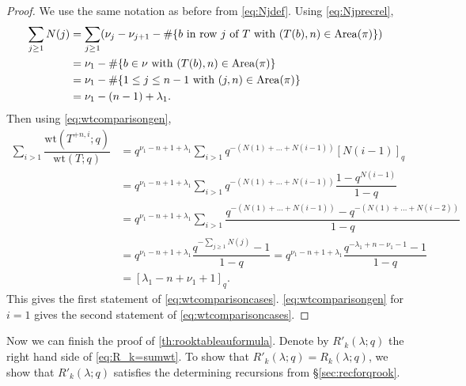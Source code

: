 \documentclass[12pt,reqno]{amsart}
\theoremstyle{plain}
\newtheorem{theorem}{Theorem}[section]
\theoremstyle{definition}
\theoremstyle{remark}
\theoremstyle{example}
\numberwithin{equation}{section}
\newcommand\ZZ{\mathbb{Z}}
\newcommand\Par{\mathrm{Par}}
\newcommand{\SYT}{\mathrm{SYT}}
\newcommand{\wt}{\mathrm{wt}}
\newcommand{\Area}{\mathrm{Area}}
\newcommand{\DD}{\mathbb{D}}
\begin{document}
\begin{proof}
We use the same notation as before from \eqref{eq:Njdef}. Using \eqref{eq:Njprecrel}, 
	\begin{align*}
		\sum_{j \geq 1} N(j) &= \sum_{j \geq 1}(\nu_{j}-\nu_{j+1} - \#\{b \hbox{ in row } j \hbox{ of } T \hbox{ with } (T(b),n) \in \Area(\pi)\})
		\\
		&= \nu_1 - \#\{b \in \nu  \hbox{ with } (T(b),n) \in \Area(\pi)\} 
		\\
		&= \nu_1 - \#\{1 \leq j \leq n-1 \hbox{ with } (j,n) \in \Area(\pi)\}
		\\
		&= \nu_1 - (n-1) + \lambda_1.
	\end{align*} Then using \eqref{eq:wtcomparisongen},
	\begin{align*}
		\sum_{i>1} \dfrac{\wt(T^{+n,i};q)}{\wt(T;q)}
		&= q^{\nu_1 - n +1  + \lambda_1} \sum_{i>1}   q^{- (N(1)+\ldots + N(i-1))} [N(i-1)]_q
		\\
		&= q^{\nu_1 - n +1  + \lambda_1} \sum_{i>1}   q^{- (N(1)+\ldots + N(i-1))} \dfrac{1-q^{N(i-1)}}{1-q}
		\\
		&= q^{\nu_1 - n +1  + \lambda_1} \sum_{i>1} \dfrac{q^{- (N(1)+\ldots + N(i-1))} - q^{- (N(1)+\ldots + N(i-2))}}{1-q}
		\\
		&= q^{\nu_1 - n +1  + \lambda_1} \dfrac{q^{-\sum_{j \geq 1} N(j)}  - 1}{1-q}
		= q^{\nu_1 - n +1  + \lambda_1} \dfrac{q^{-\lambda_1 + n- \nu_1 -1}  - 1}{1-q}
		\\
		&= [\lambda_1-n+\nu_1+1]_q.
	\end{align*}
	This gives the first statement of \eqref{eq:wtcomparisoncases}.
	\eqref{eq:wtcomparisongen} for $i=1$ gives the second statement of \eqref{eq:wtcomparisoncases}.
\end{proof}

Now we can finish the proof of \autoref{th:rooktableauformula}.
	Denote by $R'_k(\lambda;q)$ the right hand side of \eqref{eq:R_k=sumwt}. To show that $R'_k(\lambda;q) = R_k(\lambda;q)$, we show that $R'_k(\lambda;q)$ satisfies the determining recursions from \S\ref{sec:recforqrook}.
	
\end{document}
